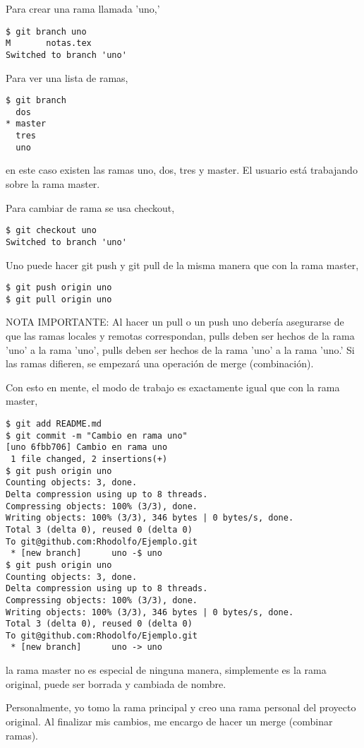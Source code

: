 \documentclass{article}
\begin{document}
Para crear una rama llamada 'uno,'
\begin{verbatim}
$ git branch uno
M       notas.tex
Switched to branch 'uno'
\end{verbatim}  

Para ver una lista de ramas,
\begin{verbatim}
$ git branch
  dos
* master
  tres
  uno
\end{verbatim}
en este caso existen las ramas uno, dos, tres y master. 
El usuario est\'{a} trabajando sobre la rama master.  

Para cambiar de rama se usa checkout,
\begin{verbatim}
$ git checkout uno
Switched to branch 'uno'
\end{verbatim}

Uno puede hacer git push y git pull de la misma manera que con la rama master,
\begin{verbatim}
$ git push origin uno
$ git pull origin uno
\end{verbatim}
NOTA IMPORTANTE: Al hacer un pull o un push uno deber\'{i}a asegurarse de que 
las ramas locales y remotas correspondan, pulls deben ser hechos de la rama 'uno' a la rama 'uno',
pulls deben ser hechos de la rama 'uno' a la rama 'uno.'
Si las ramas difieren, se empezar\'{a} una operaci\'{o}n de merge (combinaci\'{o}n).

Con esto en mente, el modo de trabajo es exactamente igual que con la rama master,
\begin{verbatim}
$ git add README.md
$ git commit -m "Cambio en rama uno"
[uno 6fbb706] Cambio en rama uno
 1 file changed, 2 insertions(+)
$ git push origin uno
Counting objects: 3, done.
Delta compression using up to 8 threads.
Compressing objects: 100% (3/3), done.
Writing objects: 100% (3/3), 346 bytes | 0 bytes/s, done.
Total 3 (delta 0), reused 0 (delta 0)
To git@github.com:Rhodolfo/Ejemplo.git
 * [new branch]      uno -$ uno
$ git push origin uno
Counting objects: 3, done.
Delta compression using up to 8 threads.
Compressing objects: 100% (3/3), done.
Writing objects: 100% (3/3), 346 bytes | 0 bytes/s, done.
Total 3 (delta 0), reused 0 (delta 0)
To git@github.com:Rhodolfo/Ejemplo.git
 * [new branch]      uno -> uno
\end{verbatim}
la rama master no es especial de ninguna manera, simplemente es la rama original, 
puede ser borrada y cambiada de nombre.

Personalmente, yo tomo la rama principal y creo una rama personal del proyecto original. 
Al finalizar mis cambios, me encargo de hacer un merge (combinar ramas).
\end{document}
